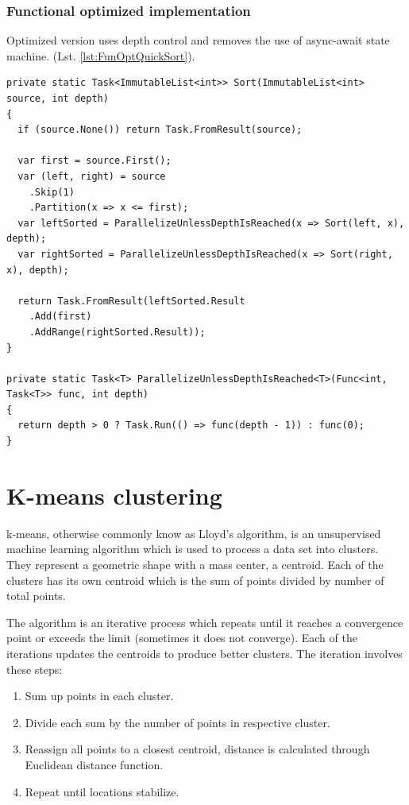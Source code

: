 \subsubsection{Functional optimized implementation}
Optimized version uses depth control and removes the use of async-await state machine.
(Lst. \ref{lst:FunOptQuickSort}).
\begin{lstlisting}[language={[sharp]c}, style=sharpcstyle, caption={Functional optimized quicksort}, label={lst:FunOptQuickSort}]
private static Task<ImmutableList<int>> Sort(ImmutableList<int> source, int depth)
{
  if (source.None()) return Task.FromResult(source);

  var first = source.First();
  var (left, right) = source
    .Skip(1)
    .Partition(x => x <= first);
  var leftSorted = ParallelizeUnlessDepthIsReached(x => Sort(left, x), depth);
  var rightSorted = ParallelizeUnlessDepthIsReached(x => Sort(right, x), depth);

  return Task.FromResult(leftSorted.Result
    .Add(first)
    .AddRange(rightSorted.Result));
}

private static Task<T> ParallelizeUnlessDepthIsReached<T>(Func<int, Task<T>> func, int depth)
{
  return depth > 0 ? Task.Run(() => func(depth - 1)) : func(0);
}
\end{lstlisting}



\clearpage
\section{K-means clustering}
\label{sec: KMeansImp}
k-means, otherwise commonly know as Lloyd's algorithm, is an unsupervised machine learning algorithm which is used to process a data set into clusters.
They represent a geometric shape with a mass center, a centroid.
Each of the clusters has its own centroid which is the sum of points divided by number of total points. 

The algorithm is an iterative process which repeats until it reaches a convergence point or exceeds the limit (sometimes it does not converge).
Each of the iterations updates the centroids to produce better clusters.
The iteration involves these steps:
\begin{enumerate}
	\item Sum up points in each cluster.
	\item Divide each sum by the number of points in respective cluster.
	\item Reassign all points to a closest centroid, distance is calculated through Euclidean distance function.
	\item Repeat until locations stabilize.
\end{enumerate}

